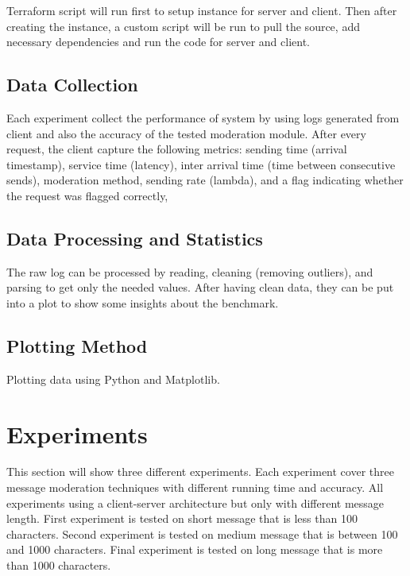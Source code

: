 \documentclass[
	english,
	accentcolor=9c,
	type=intern,
	marginpar=false,
	11pt
]{tudapub}
\begin{document}
Terraform script will run first to setup instance for server and client.
Then after creating the instance, a custom script will be run to pull the source, add necessary dependencies and run the code for server and client.

\subsection{Data Collection}
Each experiment collect the performance of system by using logs generated from client and also the accuracy of the tested moderation module.
After every request, the client capture the following metrics: sending time (arrival timestamp), service time (latency), inter arrival time (time between consecutive sends), moderation method, sending rate (lambda), and a flag indicating whether the request was flagged correctly,

\subsection{Data Processing and Statistics}
The raw log can be processed by reading, cleaning (removing outliers), and parsing to get only the needed values.
After having clean data, they can be put into a plot to show some insights about the benchmark.

\subsection{Plotting Method}
Plotting data using Python and Matplotlib.

\section{Experiments}
\label{section3}
This section will show three different experiments.
Each experiment cover three message moderation techniques with different running time and accuracy.
All experiments using a client-server architecture but only with different message length.
First experiment is tested on short message that is less than 100 characters.
Second experiment is tested on medium message that is between 100 and 1000 characters.
Final experiment is tested on long message that is more than 1000 characters.
\end{document}
